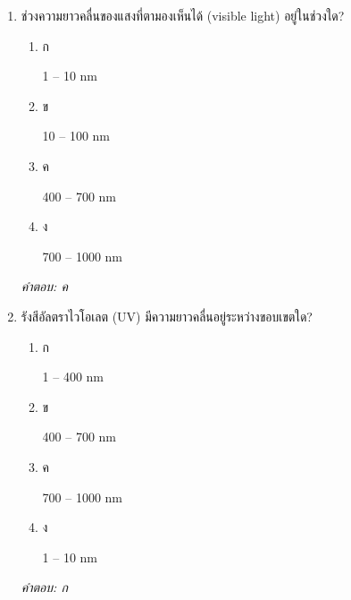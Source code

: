 \documentclass[12pt]{article}
\begin{document}
\begin{enumerate}[label=\arabic*., itemsep=0.5\baselineskip, topsep=0.5\baselineskip, leftmargin=*]
\item ช่วงความยาวคลื่นของแสงที่ตามองเห็นได้ (visible light) อยู่ในช่วงใด?
\begin{enumerate}[label=\alph*)., itemsep=0.3\baselineskip, topsep=0.3\baselineskip]
\item ก\ 
\begin{minipage}[t]{0.9\linewidth}
\raggedright 1 – 10 nm
\end{minipage}
\item ข\ 
\begin{minipage}[t]{0.9\linewidth}
\raggedright 10 – 100 nm
\end{minipage}
\item ค\ 
\begin{minipage}[t]{0.9\linewidth}
\raggedright 400 – 700 nm
\end{minipage}
\item ง\ 
\begin{minipage}[t]{0.9\linewidth}
\raggedright 700 – 1000 nm
\end{minipage}
\end{enumerate}
\vspace{-0.3\baselineskip}
\begin{small}
\textit{คำตอบ: ค}
\end{small}

\item รังสีอัลตราไวโอเลต (UV) มีความยาวคลื่นอยู่ระหว่างขอบเขตใด?
\begin{enumerate}[label=\alph*)., itemsep=0.3\baselineskip, topsep=0.3\baselineskip]
\item ก\ 
\begin{minipage}[t]{0.9\linewidth}
\raggedright 1 – 400 nm
\end{minipage}
\item ข\ 
\begin{minipage}[t]{0.9\linewidth}
\raggedright 400 – 700 nm
\end{minipage}
\item ค\ 
\begin{minipage}[t]{0.9\linewidth}
\raggedright 700 – 1000 nm
\end{minipage}
\item ง\ 
\begin{minipage}[t]{0.9\linewidth}
\raggedright 1 – 10 nm
\end{minipage}
\end{enumerate}
\vspace{-0.3\baselineskip}
\begin{small}
\textit{คำตอบ: ก}
\end{small}


\end{enumerate}
\end{document}
